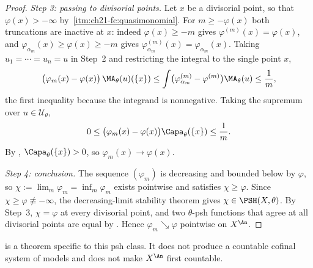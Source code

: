 \begin{proof}
\emph{Step 3: passing to divisorial points.}  Let \(x\) be a divisorial
point, so that \(\varphi(x)>-\infty\) by
\,\cref{itm:ch21-fc:quasimonomial}.  For
\(m\geq-\varphi(x)\) both truncations are inactive at \(x\): indeed
\(\varphi(x)\geq-m\) gives \(\varphi^{(m)}(x)=\varphi(x)\), and
\(\varphi_{\alpha_m}(x)\geq\varphi(x)\geq-m\) gives
\(\varphi^{(m)}_{\alpha_m}(x)=\varphi_{\alpha_m}(x)\).  Taking
\(u_1=\cdots=u_n=u\) in Step~2 and restricting the integral to the single
point \(x\),
\[
 \bigl(\varphi_{m}(x)-\varphi(x)\bigr)\,\MA_\theta(u)(\{x\})
 \leq\int\bigl(\varphi^{(m)}_{\alpha_m}-\varphi^{(m)}\bigr)\MA_\theta(u)
 \leq\frac1m ,
\]
the first inequality because the integrand is nonnegative.  Taking the
supremum over \(u\in\mathcal U_\theta\),
\[
 0\leq\bigl(\varphi_{m}(x)-\varphi(x)\bigr)\Capa_\theta(\{x\})
 \leq\frac1m .
\]
By , \(\Capa_\theta(\{x\})>0\), so
\(\varphi_m(x)\to\varphi(x)\).

\emph{Step 4: conclusion.}  The sequence \((\varphi_m)\) is decreasing and
bounded below by \(\varphi\), so \(\chi:=\lim_m\varphi_m=\inf_m\varphi_m\)
exists pointwise and satisfies \(\chi\geq\varphi\).  Since
\(\chi\geq\varphi\not\equiv-\infty\), the decreasing-limit stability theorem
 gives \(\chi\in\PSH(X,\theta)\).  By
Step~3, \(\chi=\varphi\) at every divisorial point, and two \(\theta\)-psh
functions that agree at all divisorial points are equal by
.  Hence \(\varphi_m\searrow\varphi\)
pointwise on \(X^{\An}\).
\end{proof}

\begin{remark}
 is a theorem specific to
this psh class. It does not produce a countable cofinal system of models and
does not make \(X^{\An}\) first countable.
\end{remark}

